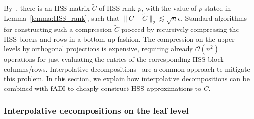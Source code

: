 By~\cite[Thm. 4.7]{KMR2019}, there is an HSS matrix
$\widetilde C$ of HSS rank $p$, with the value of $p$ stated in Lemma~\ref{lemma:HSS_rank}, such that
$\|C- \widetilde C\|_2 \lesssim \sqrt{n} \epsilon$. Standard algorithms~\cite{xia2010fast} for constructing such a compression $\widetilde C$ proceed by recursively compressing the HSS blocks and rows in a bottom-up fashion. The compression on the upper levels by orthogonal projections is expensive, requiring already $\mathcal O(n^2)$ operations for just evaluating the entries of the corresponding HSS block columns/rows. Interpolative decompositions~\cite{cheng2005compression,martinsson2011fast, xia2012superfast} are a common approach to mitigate this problem. In this section, we explain how interpolative decompositions can be combined with fADI to cheaply construct HSS approximations to $C$.

\subsubsection{Interpolative decompositions on the leaf level}  \label{sec:leafinterpolation}


